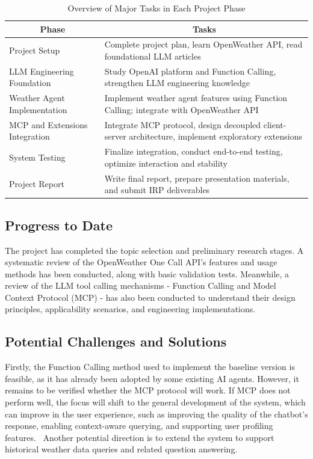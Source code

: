 \documentclass[project-plan]{report-template}
\begin{document}
\begin{table}[H]
  \centering
  \small
  \renewcommand{\arraystretch}{1.3}
  \begin{tabular}{|p{4cm}|p{11cm}|}
    \hline
    \multicolumn{1}{|c|}{\textbf{Phase}} &
    \multicolumn{1}{c|}{\textbf{Tasks}} \\
    \hline
    Project Setup & Complete project plan, learn OpenWeather API, read foundational LLM articles \\
    \hline
    LLM Engineering Foundation & Study OpenAI platform and Function Calling, strengthen LLM engineering knowledge \\
    \hline
    Weather Agent Implementation & Implement weather agent features using Function Calling; integrate with OpenWeather API \\
    \hline
    MCP and Extensions Integration & Integrate MCP protocol, design decoupled client-server architecture, implement exploratory extensions \\
    \hline
    System Testing & Finalize integration, conduct end-to-end testing, optimize interaction and stability \\
    \hline
    Project Report & Write final report, prepare presentation materials, and submit IRP deliverables \\
    \hline
  \end{tabular}
  \caption{Overview of Major Tasks in Each Project Phase}
  \label{tab:project-timeline}
\end{table}

    
\subsection{Progress to Date}
The project has completed the topic selection and preliminary research stages. A systematic review of the OpenWeather One Call API’s features and usage methods has been conducted, along with basic validation tests. Meanwhile, a review of the LLM tool calling mechanisms - Function Calling and Model Context Protocol (MCP) - has also been conducted to understand their design principles, applicability scenarios, and engineering implementations.

\subsection{Potential Challenges and Solutions}
Firstly, the Function Calling method used to implement the baseline version is feasible, as it has already been adopted by some existing AI agents. However, it remains to be verified whether the MCP protocol will work. If MCP does not perform well, the focus will shift to the general development of the system, which can improve in the user experience, such as improving the quality of the chatbot's response, enabling context-aware querying, and supporting user profiling features.~\cite{Anthropic2024Agents} Another potential direction is to extend the system to support historical weather data queries and related question answering.

\newpage

\end{document}
